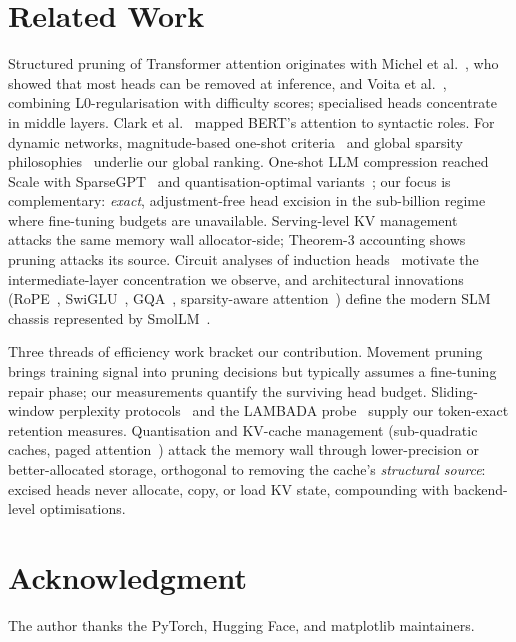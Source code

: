 \documentclass[11pt]{article}
\begin{document}
\section{Related Work}
Structured pruning of Transformer attention originates with
Michel et al.~\cite{michel2019sixteen}, who showed that most heads can be removed
at inference, and Voita et al.~\cite{voita2019analyzing}, combining
L0-regularisation with difficulty scores; specialised heads concentrate in
middle layers. Clark et
al.~\cite{clark2019what} mapped BERT's attention to syntactic roles. For dynamic
networks, magnitude-based one-shot criteria~\cite{molchanov2017pruning} and
global sparsity philosophies~\cite{hoefler2021sparsity} underlie our global
ranking. One-shot LLM compression reached Scale with SparseGPT~\cite{frantar2023sparsegpt}
and quantisation-optimal variants~\cite{frantar2023opt, xiao2023efficient, lin2024awq,
meng2024ppl}; our focus is complementary: \emph{exact}, adjustment-free head
excision in the sub-billion regime where fine-tuning budgets are unavailable.
Serving-level KV management~\cite{kwon2023efficient} attacks the same memory wall
allocator-side; Theorem-3 accounting shows pruning attacks its source. Circuit
analyses of induction
heads~\cite{elhage2021mathematical, olsson2022context, papadimitriou2022subject}
motivate the intermediate-layer concentration we observe, and architectural
innovations (RoPE~\cite{su2024roformer}, SwiGLU~\cite{shazeer2020glu},
GQA~\cite{ainslie2023gqa}, sparsity-aware attention~\cite{laterale2023heads})
define the modern SLM chassis represented by SmolLM~\cite{allal2025smollm}.

Three threads of efficiency work bracket our contribution. Movement
pruning~\cite{sanh2020movement} brings training signal into pruning decisions
but typically assumes a fine-tuning repair phase; our measurements quantify the
surviving head budget. Sliding-window perplexity
protocols~\cite{merity2016pointer} and the LAMBADA
probe~\cite{paperno2016lambada} supply our token-exact retention measures.
Quantisation and KV-cache management
(sub-quadratic caches, paged attention~\cite{kwon2023efficient}) attack the
memory wall through lower-precision or better-allocated storage, orthogonal to
removing the cache's \emph{structural source}: excised heads never allocate,
copy, or load KV state, compounding with backend-level optimisations.

\section*{Acknowledgment}
The author thanks the PyTorch, Hugging Face, and matplotlib maintainers.


\end{document}
